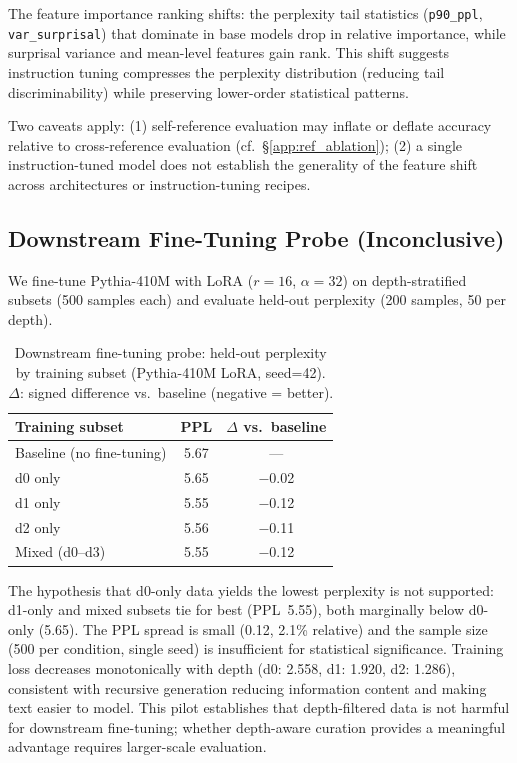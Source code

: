 The feature importance ranking shifts: the perplexity tail statistics (\texttt{p90\_ppl}, \texttt{var\_surprisal}) that dominate in base models drop in relative importance, while surprisal variance and mean-level features gain rank.
This shift suggests instruction tuning compresses the perplexity distribution (reducing tail discriminability) while preserving lower-order statistical patterns.

Two caveats apply: (1) self-reference evaluation may inflate or deflate accuracy relative to cross-reference evaluation (cf.\ \S\ref{app:ref_ablation}); (2) a single instruction-tuned model does not establish the generality of the feature shift across architectures or instruction-tuning recipes.

\subsection{Downstream Fine-Tuning Probe (Inconclusive)}
\label{app:downstream}

We fine-tune Pythia-410M with LoRA ($r{=}16$, $\alpha{=}32$) on depth-stratified subsets (500 samples each) and evaluate held-out perplexity (200 samples, 50 per depth).

\begin{table}[h]
\centering
\small
\caption{Downstream fine-tuning probe: held-out perplexity by training subset (Pythia-410M LoRA, seed=42). $\Delta$: signed difference vs.\ baseline (negative = better).}
\label{tab:downstream}
\begin{tabular}{@{}lcc@{}}
\toprule
Training subset & PPL & $\Delta$ vs.\ baseline \\
\midrule
Baseline (no fine-tuning) & 5.67 & --- \\
d0 only & 5.65 & $-$0.02 \\
d1 only & 5.55 & $-$0.12 \\
d2 only & 5.56 & $-$0.11 \\
Mixed (d0--d3) & 5.55 & $-$0.12 \\
\bottomrule
\end{tabular}
\end{table}

The hypothesis that d0-only data yields the lowest perplexity is not supported: d1-only and mixed subsets tie for best (PPL~5.55), both marginally below d0-only (5.65).
The PPL spread is small (0.12, 2.1\% relative) and the sample size (500 per condition, single seed) is insufficient for statistical significance.
Training loss decreases monotonically with depth (d0: 2.558, d1: 1.920, d2: 1.286), consistent with recursive generation reducing information content and making text easier to model.
This pilot establishes that depth-filtered data is not harmful for downstream fine-tuning; whether depth-aware curation provides a meaningful advantage requires larger-scale evaluation.


